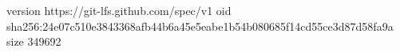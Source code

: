 version https://git-lfs.github.com/spec/v1
oid sha256:24e07c510e3843368afb44b6a45e5eabe1b54b080685f14cd55ce3d87d58fa9a
size 349692
